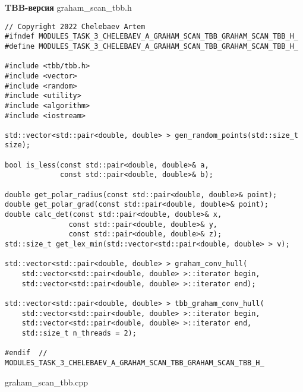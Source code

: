 \documentclass{report}
\begin{document}
\textbf{TBB-версия}
\newline
\newline graham\_scan\_tbb.h
\begin{lstlisting}
// Copyright 2022 Chelebaev Artem
#ifndef MODULES_TASK_3_CHELEBAEV_A_GRAHAM_SCAN_TBB_GRAHAM_SCAN_TBB_H_
#define MODULES_TASK_3_CHELEBAEV_A_GRAHAM_SCAN_TBB_GRAHAM_SCAN_TBB_H_

#include <tbb/tbb.h>
#include <vector>
#include <random>
#include <utility>
#include <algorithm>
#include <iostream>

std::vector<std::pair<double, double> > gen_random_points(std::size_t size);

bool is_less(const std::pair<double, double>& a,
             const std::pair<double, double>& b);

double get_polar_radius(const std::pair<double, double>& point);
double get_polar_grad(const std::pair<double, double>& point);
double calc_det(const std::pair<double, double>& x,
               const std::pair<double, double>& y,
               const std::pair<double, double>& z);
std::size_t get_lex_min(std::vector<std::pair<double, double> > v);

std::vector<std::pair<double, double> > graham_conv_hull(
    std::vector<std::pair<double, double> >::iterator begin,
    std::vector<std::pair<double, double> >::iterator end);

std::vector<std::pair<double, double> > tbb_graham_conv_hull(
    std::vector<std::pair<double, double> >::iterator begin,
    std::vector<std::pair<double, double> >::iterator end,
    std::size_t n_threads = 2);

#endif  // MODULES_TASK_3_CHELEBAEV_A_GRAHAM_SCAN_TBB_GRAHAM_SCAN_TBB_H_

\end{lstlisting}
graham\_scan\_tbb.cpp
\end{document}
